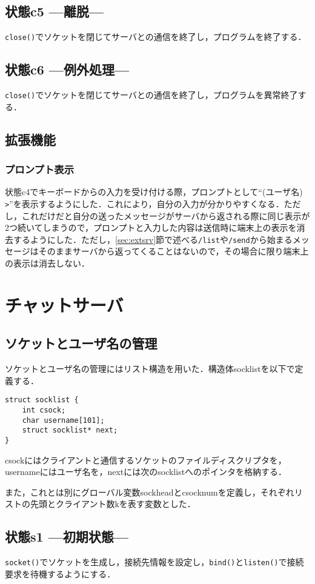 \documentclass[a4j,10pt,titlepage]{jsarticle}
\begin{document}
\subsection{状態c5 ---離脱---}
\verb|close()|でソケットを閉じてサーバとの通信を終了し，プログラムを終了する．

\subsection{状態c6 ---例外処理---}
\verb|close()|でソケットを閉じてサーバとの通信を終了し，プログラムを異常終了する．

\subsection{拡張機能}
\subsubsection{プロンプト表示}\label{sec:prompt}
状態c4でキーボードからの入力を受け付ける際，プロンプトとして``(ユーザ名) \verb|>|''を表示するようにした．これにより，自分の入力が分かりやすくなる．ただし，これだけだと自分の送ったメッセージがサーバから返される際に同じ表示が2つ続いてしまうので，プロンプトと入力した内容は送信時に端末上の表示を消去するようにした．ただし，\ref{sec:extsrv}節で述べる\verb|/list|や\verb|/send|から始まるメッセージはそのままサーバから返ってくることはないので，その場合に限り端末上の表示は消去しない．

\section{チャットサーバ}
\subsection{ソケットとユーザ名の管理}
ソケットとユーザ名の管理にはリスト構造を用いた．構造体socklistを以下で定義する．
\begin{verbatim}
struct socklist {
    int csock;
    char username[101];
    struct socklist* next;
}
\end{verbatim}

csockにはクライアントと通信するソケットのファイルディスクリプタを，usernameにはユーザ名を，nextには次のsocklistへのポインタを格納する．

また，これとは別にグローバル変数sockheadとcsocknumを定義し，それぞれリストの先頭とクライアント数kを表す変数とした．

\subsection{状態s1 ---初期状態---}
\verb|socket()|でソケットを生成し，接続先情報を設定し，\verb|bind()|と\verb|listen()|で接続要求を待機するようにする．
\end{document}
